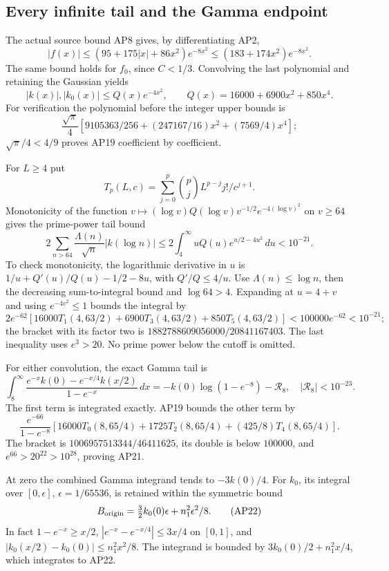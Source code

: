 \subsection{Every infinite tail and the Gamma endpoint}
The actual source bound AP8 gives, by differentiating AP2,
\[
 |f(x)|\le(95+175|x|+86x^2)e^{-8x^2}
 \le(183+174x^2)e^{-8x^2}.
\]
The same bound holds for \(f_0\), since \(C<1/3\).
Convolving the last polynomial and retaining the Gaussian yields
\[
 |k(x)|,|k_0(x)|\le Q(x)e^{-4x^2},\qquad
 Q(x)=16000+6900x^2+850x^4.\tag{AP19}
\]
For verification the polynomial before the integer upper bounds is
\[
 \frac{\sqrt\pi}{4}
 [9105363/256+(247167/16)x^2+(7569/4)x^4];
\]
\(\sqrt\pi/4<4/9\) proves AP19 coefficient by coefficient.

For \(L\ge4\) put
\[
 T_p(L,c)=\sum_{j=0}^p\binom pj L^{p-j}j!/c^{j+1}.
\]
Monotonicity of the function
\(v\mapsto(\log v)Q(\log v)v^{-1/2}e^{-4(\log v)^2}\)
on \(v\ge64\)
gives the prime-power tail bound
\[
 2\sum_{n>64}\frac{\Lambda(n)}{\sqrt n}|k(\log n)|
 \le2\int_4^\infty uQ(u)e^{u/2-4u^2}\,du<10^{-21}.
 \tag{AP20}
\]
To check monotonicity, the logarithmic derivative in \(u\) is
\(1/u+Q'(u)/Q(u)-1/2-8u\), with \(Q'/Q\le4/u\).
Use \(\Lambda(n)\le\log n\), then the decreasing sum-to-integral
bound and \(\log64>4\). Expanding at \(u=4+v\) and using
\(e^{-4v^2}\le1\) bounds the integral by
\[
 2e^{-62}[16000T_1(4,63/2)+6900T_3(4,63/2)+850T_5(4,63/2)]
 <100000e^{-62}<10^{-21};
\]
the bracket with its factor two is
\(1882788609056000/20841167403\). The last inequality uses
\(e^3>20\). No prime power below the cutoff is omitted.

For either convolution, the exact Gamma tail is
\[
 \int_8^\infty\frac{e^{-x}k(0)-e^{-x/4}k(x/2)}{1-e^{-x}}\,dx
 =-k(0)\log(1-e^{-8})-\mathcal R_8,
 \quad |\mathcal R_8|<10^{-23}.\tag{AP21}
\]
The first term is integrated exactly. AP19 bounds the other term by
\[
 \frac{e^{-66}}{1-e^{-8}}
 [16000T_0(8,65/4)+1725T_2(8,65/4)+(425/8)T_4(8,65/4)].
\]
The bracket is \(1006957513344/46411625\), its double is below
\(100000\), and \(e^{66}>20^{22}>10^{28}\), proving AP21.

At zero the combined Gamma integrand tends to \(-3k(0)/4\).
For \(k_0\), its integral over \([0,\epsilon]\),
\(\epsilon=1/65536\), is retained within the symmetric bound
\[
 B_{\rm origin}=\tfrac32 k_0(0)\epsilon+n_1^2\epsilon^2/8.
 \tag{AP22}
\]
In fact \(1-e^{-x}\ge x/2\),
\(|e^{-x}-e^{-x/4}|\le3x/4\) on \([0,1]\), and
\(|k_0(x/2)-k_0(0)|\le n_1^2x^2/8\). The integrand is bounded
by \(3k_0(0)/2+n_1^2x/4\), which integrates to AP22.

